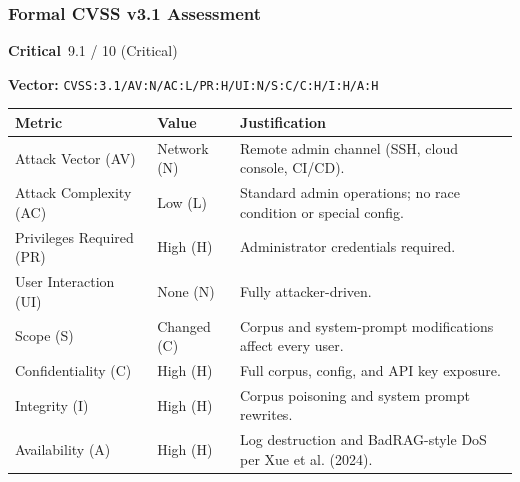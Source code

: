 \documentclass[12pt,a4paper]{report}
\newcommand{\badgecritical}{\colorbox{gray!15}{\footnotesize\textbf{Critical}}}
\newcommand{\cvssvec}[1]{\texttt{\small #1}}
\begin{document}
\subsubsection{Formal CVSS v3.1 Assessment}

\begin{cvssbox}{\badgecritical\ 9.1 / 10 (Critical)}
\vspace{2pt}
\begin{center}
\textbf{Vector:}\enspace
\cvssvec{CVSS:3.1/AV:N/AC:L/PR:H/UI:N/S:C/C:H/I:H/A:H}
\end{center}
\vspace{8pt}
\begin{tabular}{W{3.4cm}W{2.2cm}W{7.8cm}}
\toprule
  
  \small\textbf{Metric} &
  \small\textbf{Value} &
  \small\textbf{Justification} \\
  \midrule
  
  \small Attack Vector (AV)     & \small Network (N) & \small Remote admin channel (SSH, cloud console, CI/CD). \\
  
  \small Attack Complexity (AC) & \small Low (L)     & \small Standard admin operations; no race condition or special config. \\
  
  \small Privileges Required (PR)  & \small High (H) & \small Administrator credentials required. \\
  
  \small User Interaction (UI)  & \small None (N)    & \small Fully attacker-driven. \\
  
  \small Scope (S)              & \small Changed (C) & \small Corpus and system-prompt modifications affect every user. \\
  
  \small Confidentiality (C)    & \small High (H)    & \small Full corpus, config, and API key exposure. \\
  
  \small Integrity (I)          & \small High (H)    & \small Corpus poisoning and system prompt rewrites. \\
  
  \small Availability (A)       & \small High (H)    & \small Log destruction and BadRAG-style DoS per Xue et al. (2024). \\
  \bottomrule
\end{tabular}
\vspace{6pt}


\end{cvssbox}
\end{document}

